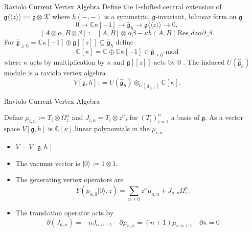 \documentclass{beamer}
\newcommand{\C}{\mathbb{C}}
\begin{document}
\begin{frame}{Raviolo Current Vertex Algebra}
    Define the 1-shifted central extension of $\mathfrak{g}\langle \langle z \rangle \rangle:= \mathfrak{g} \otimes \mathcal{K}$ where $h(-,-)$ is a symmetric, $\mathfrak{g}$-invariant, bilinear form on $\mathfrak{g}$
    \[
        0 \to \C \kappa[-1] \to \hat{\mathfrak{g}}_{h} \to \mathfrak{g}\langle \langle z \rangle \rangle \to 0,
    \]
    \[
        [A \otimes \alpha, B \otimes \beta] := [A,B] \otimes \alpha \beta - \kappa h(A,B) \mbox{Res}_z dz \alpha \partial_z \beta.
    \]
    \pause
    For $\hat{\mathfrak{g}}_{\geq 0} =  \C \kappa[-1] \oplus \mathfrak{g}[[z]]\subseteq \hat{\mathfrak{g}}_h$ define
    \[
        \C[\kappa] = \C \oplus \C \kappa[-1] \in \hat{\mathfrak{g}}_{\geq 0}\mbox{-mod}
        \] where $\kappa$ acts by multiplication by $\kappa$ and $\mathfrak{g}[[z]]$ acts by 0 .
    The induced $U(\hat{\mathfrak{g}}_h)$ module is a raviolo vertex algebra
    \[
        V[\mathfrak{g},h] : = U(\hat{\mathfrak{g}}_h) \otimes _{U(\hat{\mathfrak{g}}_{\geq 0})} \C[\kappa].
    \]
    
    
\end{frame}

\begin{frame}{Raviolo Current Vertex Algebra}

Define $\mu_{i,n}:= T_i \otimes \Omega^n_z$ and $J_{i,n}=T_i \otimes z^n$, for $(T_i)_{i=1}^n$ a basis of $\mathfrak{g}$. As a vector space $V[\mathfrak{g},h]$ is $\C[\kappa]$ linear polynomials in the $\mu_{i,n}$.

\begin{itemize}
    \item $V = V[\mathfrak{g},h]$
    \item The vacuum vector is $|0\rangle := 1\otimes 1$.
    \item The generating vertex operators are
    \[
        Y(\mu_{a,0}|0\rangle,z) = \sum_{n\geq 0 }z^n \mu_{a,n} + J_{a,n} \Omega^n_{z} .
    \]
    
    \item The translation operator acts by 
     \[
        \partial(J_{a,n})=-n J_{a,n-1} \quad \partial \mu_{a,n} = (n+1)\mu_{a,n+1} \quad \partial \kappa =0
     \]
\end{itemize}
\end{frame}
\end{document}
